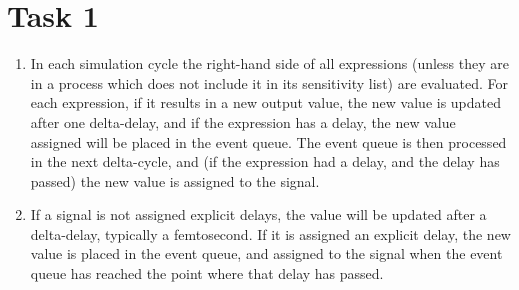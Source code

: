 \documentclass[a4paper,11pt,norsk]{article}
\begin{document}


\section*{Task 1}
\begin{enumerate}
    \item In each simulation cycle the right-hand side of all expressions 
        (unless they are in a process which does not include it in its sensitivity list) are 
        evaluated. For each expression, if it results in a new output value, the new value is 
        updated after one delta-delay, and if the expression has a delay, the new value assigned will be placed in the 
        event queue. The event queue is then processed in the next delta-cycle, and (if the expression had a delay, and the 
        delay has passed) the new value is assigned to the signal.
    \item If a signal is not assigned explicit delays, the value will be updated after a delta-delay, typically a femtosecond.
        If it is assigned an explicit delay, the new value is placed in the event queue, and assigned to the signal when the event 
        queue has reached the point where that delay has passed.
\end{enumerate}
\end{document}
